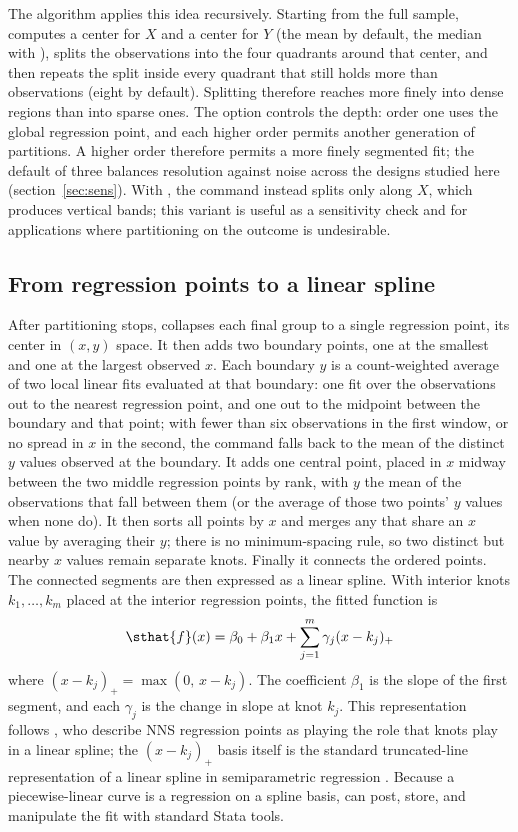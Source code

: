 \documentclass[bib]{statapress}
\begin{document}
The algorithm applies this idea recursively.  Starting from the full sample,
 computes a center for $X$ and a center for $Y$ (the mean by
default, the median with ), splits the observations into
the four quadrants around that center, and then repeats the split inside
every quadrant that still holds more than  observations
(eight by default).  Splitting
therefore reaches more finely into dense regions than into sparse ones.  The
 option controls the depth: order one uses the global
regression point, and each higher order permits another generation of
partitions.  A higher order therefore permits a more finely segmented fit;
the default of three
balances resolution against noise across the designs studied here
(section~\ref{sec:sens}).  With , the command instead
splits only along $X$, which produces vertical bands; this variant is useful
as a sensitivity check and for applications where partitioning on the outcome
is undesirable.

\subsection{From regression points to a linear spline}

After partitioning stops,  collapses each final group to a
single regression point, its center in $(x, y)$ space.  It then adds two
boundary points, one at the smallest and one at the largest observed $x$.
Each boundary $y$ is a count-weighted average of two local linear fits
evaluated at that boundary: one fit over the observations out to the nearest
regression point, and one out to the midpoint between the boundary and that
point; with fewer than six observations in the first window, or no spread in
$x$ in the second, the command falls back to the mean of the distinct $y$
values observed at the boundary.  It adds one central point, placed in $x$
midway between the two middle regression points by rank, with $y$ the mean of
the observations that fall between them (or the average of those two points'
$y$ values when none do).  It then sorts all points by $x$ and merges any that
share an $x$ value by averaging their $y$; there is no minimum-spacing rule,
so two distinct but nearby $x$ values remain separate knots.  Finally it
connects the ordered points.  The connected segments are then expressed as a
linear spline.  With interior knots $k_1,\ldots,k_m$ placed at the interior
regression points, the fitted function is
\[
  \sthat{f}(x) = \beta_0 + \beta_1 x +
    \sum_{j=1}^{m} \gamma_j (x-k_j)_+
\]
where $(x-k_j)_+=\max(0,\,x-k_j)$.  The coefficient $\beta_1$ is the slope of
the first segment, and each $\gamma_j$ is the change in slope at knot $k_j$.
This representation follows \citet{vinod_viole_2018_segments}, who describe
NNS regression points as playing the role that knots play in a linear
spline; the $(x-k_j)_+$ basis itself is the standard truncated-line
representation of a linear spline in semiparametric regression
\citep{ruppert_wand_carroll_2003}.  Because a piecewise-linear curve is a
regression on a spline basis,  can post, store, and manipulate
the fit with standard Stata tools.
\end{document}
